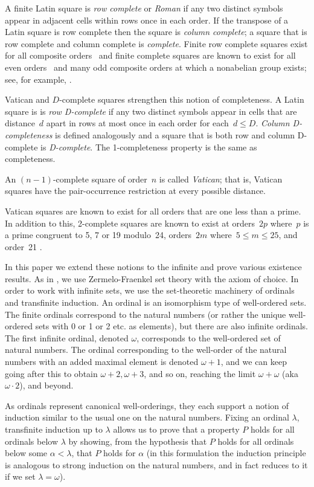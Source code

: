\documentclass[12pt,a4paper]{article}
\begin{document}
A finite Latin square is {\em row complete} or {\em Roman} if  any two distinct symbols appear in adjacent cells within rows once in each order.  If the transpose of a Latin square is row complete then the square is {\em column complete}; a square that is row complete and column complete is {\em complete}.  Finite row complete squares exist for all composite orders~\cite{Higham98} and finite complete squares are known to exist for all even orders~\cite{Gordon61} and many odd composite orders at which a nonabelian group exists; see, for example, \cite{Ollis14}.

Vatican and $D$-complete  squares strengthen this notion of completeness. 
A Latin square is is {\em row D-complete} if any two distinct symbols appear in cells that are distance~$d$ apart in rows at most once in each order for each~$d \leq D$. {\em Column D-completeness} is defined analogously and a square that is both row and column D-complete is {\em D-complete}.  The 1-completeness property is the same as completeness.

An $(n-1)$-complete square of order~$n$ is called {\em Vatican}; that is, Vatican squares have the pair-occurrence restriction at every possible distance.

Vatican squares are known to exist for all orders that are one less than a prime.  In addition to this, 2-complete squares are known to exist at orders~$2p$ where~$p$ is a prime congruent to 5, 7 or 19 modulo~24, orders~$2m$ where~$5 \leq m \leq 25$, and order~21 \cite{TuscanCRC,OllisTFSG}.


In this paper we extend these notions to the infinite and prove various existence results.  As in \cite{CW02}, we use Zermelo-Fraenkel set theory with the axiom of choice. In order to work with infinite sets, we use the set-theoretic machinery of ordinals and transfinite induction. An ordinal is an isomorphism type of well-ordered sets. The finite ordinals correspond to the natural numbers (or rather
the unique well-ordered sets with 0 or 1 or 2 etc. as elements), but there are also infinite ordinals.
The first infinite ordinal, denoted $\omega$, corresponds to the well-ordered set of natural numbers.
The ordinal corresponding to the well-order of the natural numbers with an added maximal element is
denoted $\omega+1$, and we can keep going after this to obtain $\omega+2, \omega+3$, and so on, reaching the limit $\omega+\omega$ (aka $\omega\cdot 2$), and beyond. 

As ordinals represent canonical well-orderings, they each support a notion of induction similar to the usual one on the natural numbers. Fixing an ordinal $\lambda$, transfinite induction up to $\lambda$ allows us to prove that a property $P$ holds for all ordinals below $\lambda$ by showing, from the hypothesis that $P$ holds for all ordinals below some $\alpha<\lambda$, that $P$ holds for $\alpha$ (in this formulation
the induction principle is analogous to strong induction on the natural numbers, and in fact reduces to it if we set $\lambda=\omega$).
\end{document}
